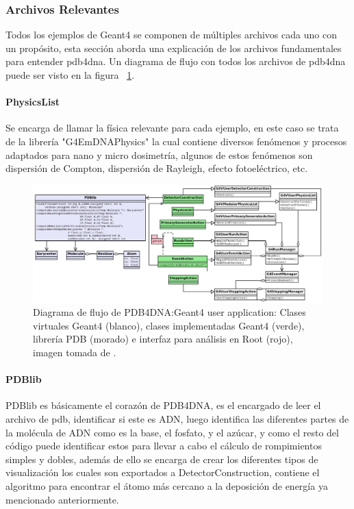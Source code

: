 \subsubsection{Archivos Relevantes}
Todos los ejemplos de Geant4 se componen de múltiples archivos cada uno con un propósito, esta sección aborda una explicación de los archivos fundamentales para entender pdb4dna. Un diagrama de flujo con todos los archivos de pdb4dna puede ser visto en la figura ~\ref{fig:UoC}.

\paragraph{PhysicsList}
Se encarga de llamar la física relevante para cada ejemplo, en este caso se trata de la librería "G4EmDNAPhysics" la cual contiene diversos fenómenos y procesos adaptados para nano y micro dosimetría, algunos de estos fenómenos son dispersión de Compton, dispersión de Rayleigh, efecto fotoeléctrico, etc.

\begin{figure}[htbp]
    \centering
    \includegraphics[width=1\linewidth]{./Figures/flujo.png}
    \caption[Diagrama de flujo de PDB4DNA]{Diagrama de flujo de PDB4DNA:Geant4 user application: Clases virtuales Geant4  (blanco), clases implementadas Geant4 (verde), librería PDB (morado) e interfaz para análisis en Root (rojo), imagen tomada de \cite{pdblib}.}
    \label{fig:UoC}
\end{figure}

\paragraph{PDBlib}

PDBlib es básicamente el corazón de PDB4DNA, es el encargado de leer el archivo de pdb, identificar si este es ADN, luego identifica las diferentes partes de la molécula de ADN como es la base, el fosfato, y el azúcar, y como el resto del código puede identificar estos para llevar a cabo el cálculo de rompimientos simples y dobles, además de ello se encarga de crear los diferentes tipos de visualización los cuales son exportados a DetectorConstruction, contiene el algoritmo para encontrar el átomo más cercano a la deposición de energía ya mencionado anteriormente.



